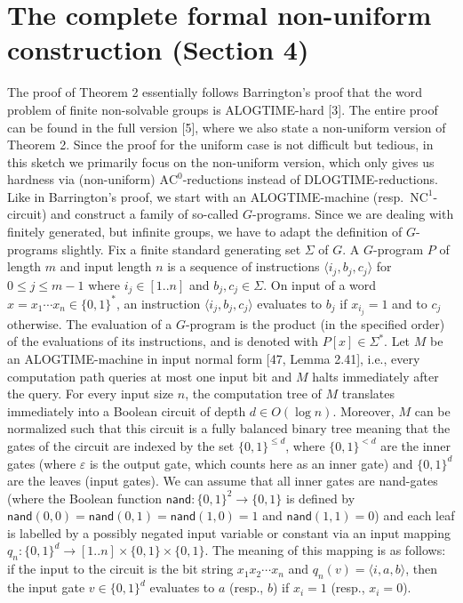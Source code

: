 \section*{The complete formal non-uniform construction (Section 4)}
The proof of Theorem 2 essentially follows Barrington's proof that the word problem of finite non-solvable groups is ALOGTIME-hard [3]. The entire proof can be found in the full version [5], where we also state a non-uniform version of Theorem 2. Since the proof for the uniform case is not difficult but tedious, in this sketch we primarily focus on the non-uniform version, which only gives us hardness via (non-uniform) $\mathrm{AC}^0$-reductions instead of DLOGTIME-reductions.
Like in Barrington's proof, we start with an ALOGTIME-machine (resp.\ $\mathrm{NC}^1$-circuit) and construct a family of so-called $G$-programs. Since we are dealing with finitely generated, but infinite groups, we have to adapt the definition of $G$-programs slightly.
Fix a finite standard generating set $\Sigma$ of $G$. A $G$-program $P$ of length $m$ and input length $n$ is a sequence of instructions $\langle i_j,b_j,c_j\rangle$ for $0\le j\le m-1$ where $i_j\in[1..n]$ and $b_j,c_j\in\Sigma$. On input of a word $x=x_1\cdots x_n\in\{0,1\}^*$, an instruction $\langle i_j,b_j,c_j\rangle$ evaluates to $b_j$ if $x_{i_j}=1$ and to $c_j$ otherwise. The evaluation of a $G$-program is the product (in the specified order) of the evaluations of its instructions, and is denoted with $P[x]\in\Sigma^*$.
Let $M$ be an ALOGTIME-machine in input normal form [47, Lemma 2.41], i.e., every computation path queries at most one input bit and $M$ halts immediately after the query. For every input size $n$, the computation tree of $M$ translates immediately into a Boolean circuit of depth $d\in O(\log n)$. Moreover, $M$ can be normalized such that this circuit is a fully balanced binary tree meaning that the gates of the circuit are indexed by the set $\{0,1\}^{\le d}$, where $\{0,1\}^{<d}$ are the inner gates (where $\varepsilon$ is the output gate, which counts here as an inner gate) and $\{0,1\}^d$ are the leaves (input gates). We can assume that all inner gates are nand-gates (where the Boolean function $\mathsf{nand}:\{0,1\}^2\to\{0,1\}$ is defined by $\mathsf{nand}(0,0)=\mathsf{nand}(0,1)=\mathsf{nand}(1,0)=1$ and $\mathsf{nand}(1,1)=0$) and each leaf is labelled by a possibly negated input variable or constant via an input mapping $q_n:\{0,1\}^d\to[1..n]\times\{0,1\}\times\{0,1\}$. The meaning of this mapping is as follows: if the input to the circuit is the bit string $x_1x_2\cdots x_n$ and $q_n(v)=\langle i,a,b\rangle$, then the input gate $v\in\{0,1\}^d$ evaluates to $a$ (resp., $b$) if $x_i=1$ (resp., $x_i=0$).
